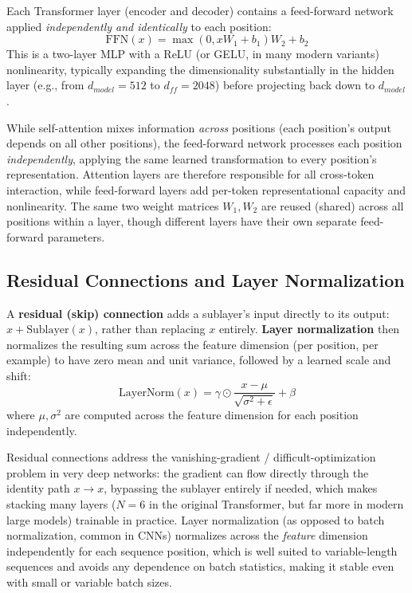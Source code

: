 \documentclass[11pt]{article}
\begin{document}
Each Transformer layer (encoder and decoder) contains a feed-forward network applied \emph{independently and identically} to each position:
\[
\text{FFN}(x) = \max(0, xW_1 + b_1)W_2 + b_2
\]
This is a two-layer MLP with a ReLU (or GELU, in many modern variants) nonlinearity, typically expanding the dimensionality substantially in the hidden layer (e.g., from $d_{model}=512$ to $d_{ff}=2048$) before projecting back down to $d_{model}$.

\begin{keyidea}
While self-attention mixes information \emph{across} positions (each position's output depends on all other positions), the feed-forward network processes each position \emph{independently}, applying the same learned transformation to every position's representation. Attention layers are therefore responsible for all cross-token interaction, while feed-forward layers add per-token representational capacity and nonlinearity. The same two weight matrices $W_1, W_2$ are reused (shared) across all positions within a layer, though different layers have their own separate feed-forward parameters.
\end{keyidea}

\subsection*{Residual Connections and Layer Normalization}

\begin{defbox}
A \textbf{residual (skip) connection} adds a sublayer's input directly to its output: $x + \text{Sublayer}(x)$, rather than replacing $x$ entirely. \textbf{Layer normalization} then normalizes the resulting sum across the feature dimension (per position, per example) to have zero mean and unit variance, followed by a learned scale and shift:
\[
\text{LayerNorm}(x) = \gamma \odot \frac{x - \mu}{\sqrt{\sigma^2 + \epsilon}} + \beta
\]
where $\mu, \sigma^2$ are computed across the feature dimension for each position independently.
\end{defbox}

\begin{keyidea}
Residual connections address the vanishing-gradient / difficult-optimization problem in very deep networks: the gradient can flow directly through the identity path $x \to x$, bypassing the sublayer entirely if needed, which makes stacking many layers ($N=6$ in the original Transformer, but far more in modern large models) trainable in practice. Layer normalization (as opposed to batch normalization, common in CNNs) normalizes across the \emph{feature} dimension independently for each sequence position, which is well suited to variable-length sequences and avoids any dependence on batch statistics, making it stable even with small or variable batch sizes.
\end{keyidea}
\end{document}
